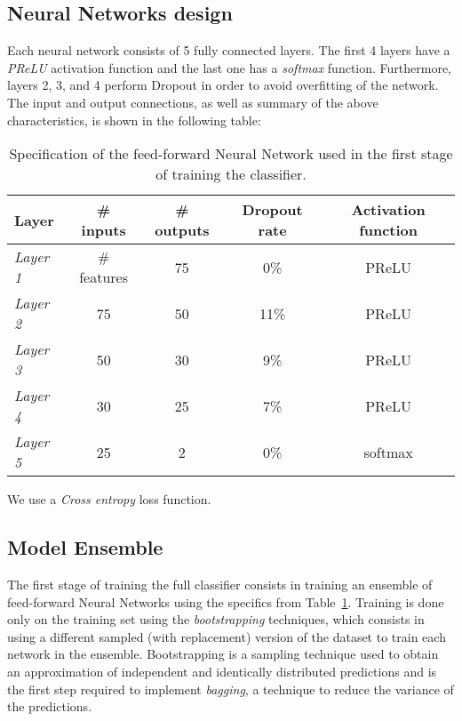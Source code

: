 \documentclass[conference]{IEEEtran}
\begin{document}
\subsection{Neural Networks design}
\label{sec:NN_design}
Each neural network consists of 5 fully connected layers. The first 4 layers
have a \textit{PReLU} activation function and the last one has a
\textit{softmax} function. Furthermore, layers 2, 3, and 4 perform Dropout in
order to avoid overfitting of the network. The input and output connections, as
well as summary of the above characteristics, is shown in the following table:

\begin{table}
	\centering
	\begin{tabular}[H]{ l c c c c }
		\textbf{Layer} & \textbf{\# inputs} & \textbf{\# outputs} &
			\textbf{Dropout rate} & \textbf{Activation function} \\ \hline
		\textit{Layer 1} & \# features & 75 & 0\% & PReLU \\
		\textit{Layer 2} & 75 & 50 & 11\% & PReLU \\
		\textit{Layer 3} & 50 & 30 & 9\% & PReLU \\
		\textit{Layer 4} & 30 & 25 & 7\% & PReLU \\
		\textit{Layer 5} & 25 & 2 & 0\% & softmax \\
	\end{tabular}
	\caption{Specification of the feed-forward Neural Network used in the first
		stage of training the classifier.}
	\label{tab:model1}
\end{table}

We use a \textit{Cross entropy} loss function.

\subsection{Model Ensemble}
The first stage of training the full classifier consists in training an ensemble
of feed-forward Neural Networks using the specifics from Table~\ref{tab:model1}.
Training is done only on the training set using the \textit{bootstrapping}
techniques, which consists in using a different sampled (with replacement)
version of the dataset to train each network in the ensemble. Bootstrapping is a
sampling technique used to obtain an approximation of independent and
identically distributed predictions and is the first step required to implement
\textit{bagging}, a technique to reduce the variance of the predictions.
\end{document}
